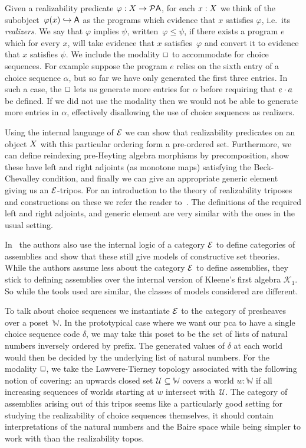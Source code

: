 \documentclass{easychair}
\begin{document}
Given a realizability predicate \(\varphi : {{X}\to{\mathcal{P}{\ensuremath{\mathsf{A}}}}}\), for each \(x : X\)
we think of the subobject~\(\varphi(x) \hookrightarrow \mathsf{A}\) as the programs
which evidence that \(x\) satisfies \(\varphi\), i.e.\ its \textit{realizers}.
%
We say that \(\varphi\) implies \(\psi\), written~\(\varphi\leq\psi\), if there
exists a program \(e\) which for every \(x\), will take evidence that \(x\)
satisfies~\(\varphi\) and convert it to evidence that \(x\) satisfies \(\psi\).
%
We include the modality \(\Box\) to accommodate for choice sequences.
%
For example suppose the program \(e\) relies on the sixth entry of a choice
sequence \(\alpha\), but so far we have only generated the first three entries.
%
In such a case, the \(\Box\) lets us generate more entries for \(\alpha\)
before requiring that \({e}\cdot{a}\) be defined.
%
If we did not use the modality then we would not be able to generate more
entries in \(\alpha\), effectively disallowing the use of choice sequences as
realizers.

Using the internal language of \(\mathcal{E}\) we can show that realizability predicates
on an object \(X\) with this particular ordering form a pre-ordered set.
%
Furthermore, we can define reindexing pre-Heyting algebra morphisms by
precomposition, show these have left and right adjoints (as monotone maps)
satisfying the Beck-Chevalley condition, and finally we can give an appropriate
generic element giving us an \(\mathcal{E}\)-tripos.
%
For an introduction to the theory of realizability triposes and constructions on
these we refer the reader to~\cite[\S2]{oostenRealizabilityIntroductionIts2008}.
%
The definitions of the required left and right adjoints, and generic
element are very similar with the ones in the usual setting.

In~\cite{vandenbergAspectsPredicativeAlgebraic2011} the authors also use the
internal logic of a category \(\mathcal{E}\) to define categories of assemblies and show
that these still give models of constructive set theories.
%
While the authors assume less about the category \(\mathcal{E}\) to define assemblies,
they stick to defining assemblies over the internal version of Kleene's first
algebra \(\mathcal{K}_{1}\).
%
So while the tools used are similar, the classes of models considered are
different.

To talk about choice sequences we instantiate \(\mathcal{E}\) to the category of
presheaves over a poset~\(\mathbb{W}\).
%
In the prototypical case where we want our pca to have a single choice sequence
code \(\delta\), we may take this poset to be the set of lists of natural
numbers inversely ordered by prefix.
%
The generated values of \(\delta\) at each world would then be decided by the
underlying list of natural numbers.
%
For the modality \(\Box\), we take the Lawvere-Tierney topology associated
with the following notion of covering: an upwards closed set
\(\mathcal{U} \subseteq \mathbb{W}\) covers a world \(w : \mathbb{W}\) if all
increasing sequences of worlds starting at \(w\) intersect with~\(\mathcal{U}\).
%
The category of assemblies arising out of this tripos seems like a particularly
good setting for studying the realizability of choice sequences themselves,
it should contain interpretations of the natural numbers and the Baire space
while being simpler to work with than the realizability topos.
\end{document}

